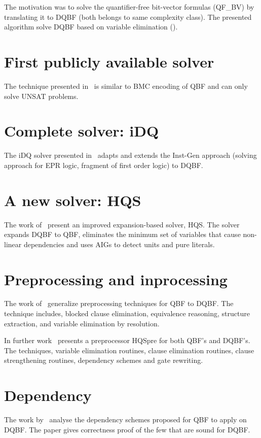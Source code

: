 \documentclass[runningheads]{llncs}
\begin{document}
The motivation was to solve the quantifier-free bit-vector formulas (QF\_BV) by translating it to DQBF (both belongs to same complexity class).
%
The presented algorithm solve DQBF based on variable elimination (\cite{biere2004resolve}).

\section{First publicly available solver}
The technique presented in~\cite{finkbeiner2014fast} is similar to BMC encoding of QBF and can only solve UNSAT problems.

\section{Complete solver: iDQ}
The iDQ solver presented in~\cite{frohlich2014idq} adapts and extends the Inst-Gen approach (solving approach for EPR logic, fragment of first order logic) to DQBF.

\section{A new solver: HQS}
The work of~\cite{gitina2015solving} present an improved expansion-based solver, HQS.
%
The solver expands DQBF to QBF, eliminates the minimum set of variables that cause non-linear
dependencies and uses AIGs to detect units and pure literals.

\section{Preprocessing and inprocessing}
The work of~\cite{wimmer2015preprocessing} generalize preprocessing techniques for QBF to DQBF.
%
The technique includes, blocked clause elimination, equivalence reasoning, structure extraction, and variable elimination by resolution.

In further work~\cite{wimmer2017hqspre} presents a preprocessor HQSpre for both QBF's and DQBF's.
%
The techniques, variable elimination routines, clause elimination routines, clause strengthening routines, dependency schemes and gate rewriting.

\section{Dependency}
The work by~\cite{wimmer2016dependency} analyse the dependency
schemes proposed for QBF to apply on DQBF.
%
The paper gives correctness proof of the few that are sound for DQBF.
%
\end{document}
